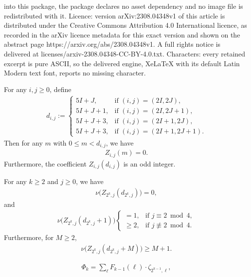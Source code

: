 \documentclass[10pt,a4paper]{amsart}
\begin{document}
into this package, the package declares no asset dependency and no image file is redistributed with it. Licence: version arXiv:2308.04348v1 of this article is distributed under the Creative Commons Attribution 4.0 International licence, as recorded in the arXiv licence metadata for this exact version and shown on the abstract page https://arxiv.org/abs/2308.04348v1. A full rights notice is delivered at licenses/arxiv-2308.04348-CC-BY-4.0.txt. Characters: every retained excerpt is pure ASCII, so the delivered engine, XeLaTeX with its default Latin Modern text font, reports no missing character.
\begin{theorem}\label{th:Z-nonvanishing}
	For any $i,j\ge 0$, define
	\begin{align*}
		d_{i,j}:=\begin{cases}
			5I+J, & \text{if $(i,j)=(2I,2J)$},\\
			5I+J+1, & \text{if $(i,j)=(2I,2J+1)$},\\
			5I+J+3, & \text{if $(i,j)=(2I+1,2J)$},\\
			5I+J+3, & \text{if $(i,j)=(2I+1,2J+1)$}.
		\end{cases}
	\end{align*}
	Then for any $m$ with $0\le m< d_{i,j}$, we have
	\begin{align*}
		Z_{i,j}(m) = 0.
	\end{align*}
	Furthermore, the coefficient $Z_{i,j}(d_{i,j})$ is an odd integer.
\end{theorem}

\begin{theorem}\label{th:Z-2-adic}
	For any $k\ge 2$ and $j\ge 0$, we have
	\begin{align*} %
		\nu\big(Z_{2^k,j}(d_{2^k,j})\big) = 0,
	\end{align*}
	and
	\begin{align*} %
		\nu\big(Z_{2^k,j}(d_{2^k,j}+1)\big) \begin{cases}
			= 1, & \text{if $j\equiv 2 \bmod{4}$},\\
			\ge 2, & \text{if $j\not\equiv 2 \bmod{4}$}.
		\end{cases}
	\end{align*}
	Furthermore, for $M\ge 2$,
	\begin{align*} %
		\nu\big(Z_{2^k,j}(d_{2^k,j}+M)\big) \ge M+1.
	\end{align*}
\end{theorem}

	\begin{align}\label{eq:F-xi-rec}
		\Phi_k = \sum_{\ell} F_{k-1}(\ell) \cdot \zeta_{2^{k-1},\ell},
	\end{align}
\end{document}
